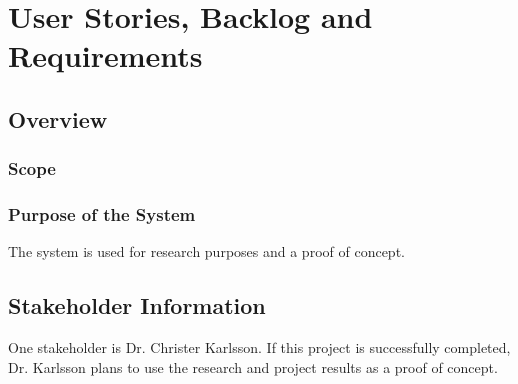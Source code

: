 \chapter{User Stories, Backlog and Requirements}
\section{Overview}









\subsection{Scope}




\subsection{Purpose of the System}
The system is used for research purposes and a proof of concept. 


\section{ Stakeholder Information}
One stakeholder is Dr. Christer Karlsson. If this project is successfully completed,
Dr. Karlsson plans to use the research and project results as a proof of concept. 


